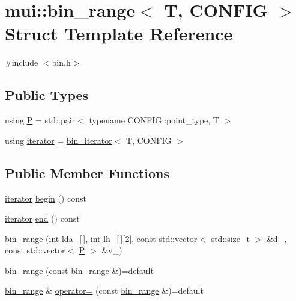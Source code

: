 \hypertarget{structmui_1_1bin__range}{}\section{mui\+:\+:bin\+\_\+range$<$ T, C\+O\+N\+F\+IG $>$ Struct Template Reference}
\label{structmui_1_1bin__range}


{\ttfamily \#include $<$bin.\+h$>$}

\subsection*{Public Types}
\begin{DoxyCompactItemize}
\item 
using \hyperlink{structmui_1_1bin__range_af4a922fdb02454e89adce8ea9bb21f35}{P} = std\+::pair$<$ typename C\+O\+N\+F\+I\+G\+::point\+\_\+type, T $>$
\item 
using \hyperlink{structmui_1_1bin__range_ad39d02903689c0911cffe91dc8634297}{iterator} = \hyperlink{structmui_1_1bin__iterator}{bin\+\_\+iterator}$<$ T, C\+O\+N\+F\+IG $>$
\end{DoxyCompactItemize}
\subsection*{Public Member Functions}
\begin{DoxyCompactItemize}
\item 
\hyperlink{structmui_1_1bin__range_ad39d02903689c0911cffe91dc8634297}{iterator} \hyperlink{structmui_1_1bin__range_a88d3f67ab1057072e6e9baa8cc153951}{begin} () const
\item 
\hyperlink{structmui_1_1bin__range_ad39d02903689c0911cffe91dc8634297}{iterator} \hyperlink{structmui_1_1bin__range_aa495ff09ee344767ed68234edbaa6b9c}{end} () const
\item 
\hyperlink{structmui_1_1bin__range_a9e41a34fe6f381f3c02d216dd66efe24}{bin\+\_\+range} (int lda\+\_\+\mbox{[}$\,$\mbox{]}, int lh\+\_\+\mbox{[}$\,$\mbox{]}\mbox{[}2\mbox{]}, const std\+::vector$<$ std\+::size\+\_\+t $>$ \&d\+\_\+, const std\+::vector$<$ \hyperlink{structmui_1_1bin__range_af4a922fdb02454e89adce8ea9bb21f35}{P} $>$ \&v\+\_\+)
\item 
\hyperlink{structmui_1_1bin__range_a6fa60344f15c152723ac5bda585b707d}{bin\+\_\+range} (const \hyperlink{structmui_1_1bin__range}{bin\+\_\+range} \&)=default
\item 
\hyperlink{structmui_1_1bin__range}{bin\+\_\+range} \& \hyperlink{structmui_1_1bin__range_ad35f0c7c78571e7247cff2b4a381529e}{operator=} (const \hyperlink{structmui_1_1bin__range}{bin\+\_\+range} \&)=default
\end{DoxyCompactItemize}
